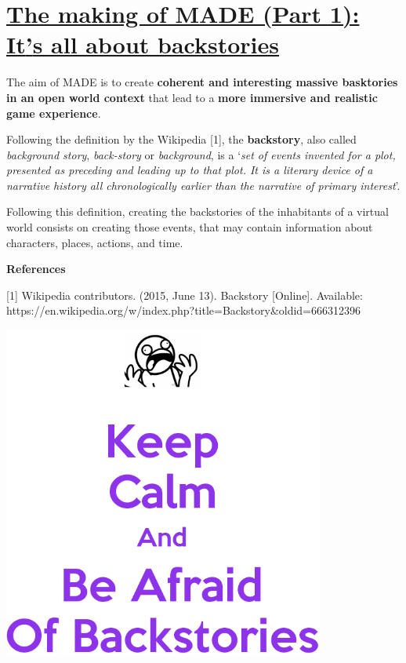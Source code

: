 \documentclass[a4paper]{article}
\title{}
\author{}
\date{2015-09-27T17:26:35.118163052}
\newcommand\textstyleStrongEmphasis[1]{\textbf{#1}}
\newcommand\textstyleEmphasis[1]{\textit{#1}}
\begin{document}
\section[The making of MADE (Part 1): It{\textquoteright}s all about
backstories]{\href{http://www.velonuboso.com/made/2015/06/13/making-part-1-events-facts-deductions-backstories/}{The
making of MADE (Part 1): It{\textquoteright}s all about backstories}}
The aim of MADE is to create \textstyleStrongEmphasis{coherent and
interesting massive basktories in an open world context} that lead to a
\textstyleStrongEmphasis{more immersive and realistic game experience}.

Following the definition by the Wikipedia [1], the
\textstyleStrongEmphasis{backstory}, also called
\textstyleEmphasis{background story}, \textstyleEmphasis{back-story} or
\textstyleEmphasis{background}, is a
{\textquoteleft}\textstyleEmphasis{set of events invented for a plot,
presented as preceding and leading up to that plot. It is a literary
device of a narrative history all chronologically earlier than the
narrative of primary interest}{\textquoteright}.

Following this definition, creating the backstories of the inhabitants
of a virtual world consists on creating those events, that may contain
information about characters, places, actions, and time.

{\bfseries
References}

[1] Wikipedia contributors. (2015, June 13). Backstory [Online].
Available:
https://en.wikipedia.org/w/index.php?title=Backstory\&oldid=666312396

\href{http://pikachu-jenna.deviantart.com/art/Keep-Calm-And-Be-Afraid-of-Backstories-ASDFMovie-8-493174371}{
\includegraphics[width=10.61cm,height=11.035cm]{makingofmade113-img1.png}
}
\end{document}

